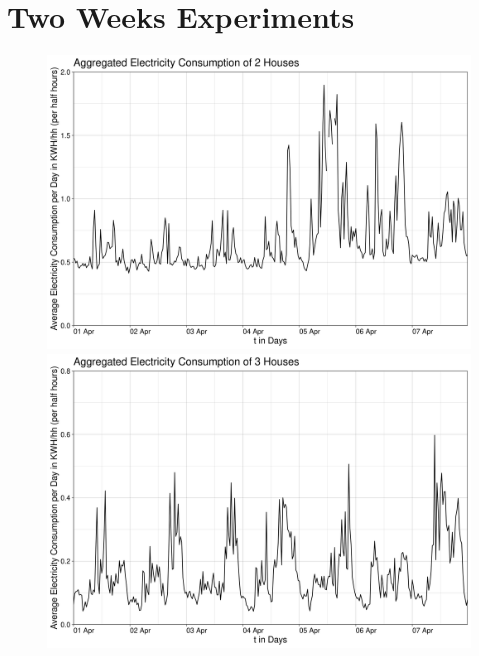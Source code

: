 \chapter{Two Weeks Experiments}
\enlargethispage{10}
\vspace*{-10\baseline}
\begin{figure}[!Hhtp]
\centering
\includegraphics[width=0.8\columnwidth]{images/Aggregated Electricity Consumption of 2 Houses6.png}
\caption[Aggregated Electricity Consumption of 2 Houses of the 2nd Experiment of the 2nd Experiment]{}
\label{img:2_Houses_weekly}
\centering
\includegraphics[width=0.8\columnwidth]{images/Aggregated Electricity Consumption of 3 Houses5.png}
\caption[Aggregated Electricity Consumption of 3 Houses of the 2nd Experiment]{}
\label{img:3_Houses_weekly}
\end{figure}

